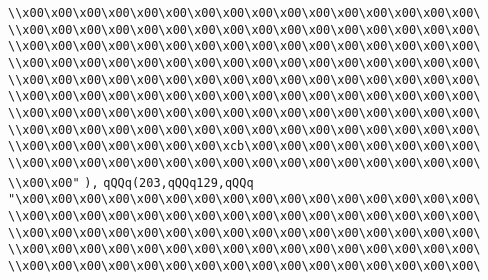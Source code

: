 \verb|\\x00\x00\x00\x00\x00\x00\x00\x00\x00\x00\x00\x00\x00\x00\x00\x00\|\newline
\verb|\\x00\x00\x00\x00\x00\x00\x00\x00\x00\x00\x00\x00\x00\x00\x00\x00\|\newline
\verb|\\x00\x00\x00\x00\x00\x00\x00\x00\x00\x00\x00\x00\x00\x00\x00\x00\|\newline
\verb|\\x00\x00\x00\x00\x00\x00\x00\x00\x00\x00\x00\x00\x00\x00\x00\x00\|\newline
\verb|\\x00\x00\x00\x00\x00\x00\x00\x00\x00\x00\x00\x00\x00\x00\x00\x00\|\newline
\verb|\\x00\x00\x00\x00\x00\x00\x00\x00\x00\x00\x00\x00\x00\x00\x00\x00\|\newline
\verb|\\x00\x00\x00\x00\x00\x00\x00\x00\x00\x00\x00\x00\x00\x00\x00\x00\|\newline
\verb|\\x00\x00\x00\x00\x00\x00\x00\x00\x00\x00\x00\x00\x00\x00\x00\x00\|\newline
\verb|\\x00\x00\x00\x00\x00\x00\x00\xcb\x00\x00\x00\x00\x00\x00\x00\x00\|\newline
\verb|\\x00\x00\x00\x00\x00\x00\x00\x00\x00\x00\x00\x00\x00\x00\x00\x00\|\newline
\verb|\\x00\x00"|\newline
\verb|),|\newline
\verb|qQQq(203,qQQq129,qQQq|\newline
\verb|"\x00\x00\x00\x00\x00\x00\x00\x00\x00\x00\x00\x00\x00\x00\x00\x00\|\newline
\verb|\\x00\x00\x00\x00\x00\x00\x00\x00\x00\x00\x00\x00\x00\x00\x00\x00\|\newline
\verb|\\x00\x00\x00\x00\x00\x00\x00\x00\x00\x00\x00\x00\x00\x00\x00\x00\|\newline
\verb|\\x00\x00\x00\x00\x00\x00\x00\x00\x00\x00\x00\x00\x00\x00\x00\x00\|\newline
\verb|\\x00\x00\x00\x00\x00\x00\x00\x00\x00\x00\x00\x00\x00\x00\x00\x00\|\newline
